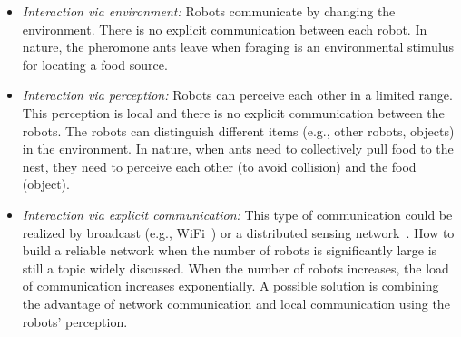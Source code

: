 \begin{itemize}

\item \textit{Interaction via environment:} Robots communicate by changing the environment. There is no explicit communication between each robot. In nature, the pheromone ants leave when foraging is an environmental stimulus for locating a food source.  

\item \textit{Interaction via perception:} Robots can perceive each other in a limited range. This perception is local and there is no explicit communication between the robots. The robots can distinguish different items (e.g., other robots, objects) in the environment. In nature, when ants need to collectively pull food to the nest, they need to perceive each other (to avoid collision) and the food (object).

\item \textit{Interaction via explicit communication:} This type of communication could be realized by broadcast (e.g., WiFi~\cite{Gerkey:TRA:2002}) or a distributed sensing network~\cite{Winfield:LNCS:2000}. How to build a reliable network when the number of robots is significantly large is still a topic widely discussed. When the number of robots increases, the load of communication increases exponentially. A possible solution is combining the advantage of network communication and local communication using the robots' perception.

\end{itemize}

